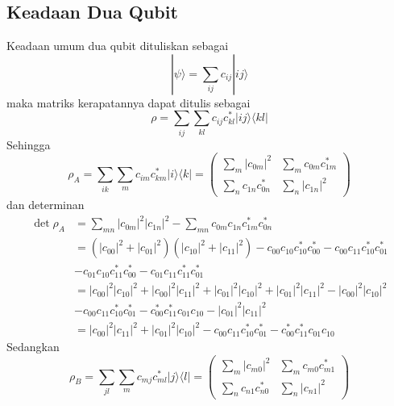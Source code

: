 \subsection{Keadaan Dua Qubit}
\par
Keadaan umum dua qubit dituliskan sebagai
\begin{equation}
	|\psi\rangle = \sum_{i j} c_{i j} | i j \rangle
\end{equation}
maka matriks kerapatannya dapat ditulis sebagai
\begin{equation}
	\rho = \sum_{i j} \sum_{k l} c_{i j} c^{*}_{k l} | i j \rangle \langle k l |
\end{equation}
Sehingga
\begin{equation}
	\rho_A
	= \sum_{i k} \sum_{m} c_{i m} c^{*}_{k m} | i \rangle \langle k |
	= \begin{pmatrix}
		\sum_m |c_{0m}|^2 & \sum_m c_{0m} c^{*}_{1m} \\
		\sum_n c_{1n} c^{*}_{0n} & \sum_n |c_{1n}|^2
	\end{pmatrix}
\end{equation}
dan determinan
\begin{equation}
	\begin{aligned}
		\det \rho_A
		&= \sum_{m n} |c_{0m}|^2 |c_{1n}|^2
		- \sum_{m n} c_{0m} c_{1n} c^{*}_{1m} c^{*}_{0n}\\
		&= (|c_{00}|^2 + |c_{01}|^2)(|c_{10}|^2 + |c_{11}|^2) - c_{00} c_{10} c^{*}_{10} c^{*}_{00} - c_{00} c_{11} c^{*}_{10} c^{*}_{01}\\
		&- c_{01} c_{10} c^{*}_{11} c^{*}_{00} - c_{01} c_{11} c^{*}_{11} c^{*}_{01}\\
		&= |c_{00}|^2 |c_{10}|^2
		+ |c_{00}|^2 |c_{11}|^2
		+ |c_{01}|^2 |c_{10}|^2
		+ |c_{01}|^2 |c_{11}|^2- |c_{00}|^2 |c_{10}|^2\\
		&- c_{00} c_{11} c^{*}_{10} c^{*}_{01}
		- c^{*}_{00} c^{*}_{11} c_{01} c_{10}- |c_{01}|^2 |c_{11}|^2\\
		&= |c_{00}|^2 |c_{11}|^2
		+ |c_{01}|^2 |c_{10}|^2
		- c_{00} c_{11} c^{*}_{10} c^{*}_{01}
		- c^{*}_{00} c^{*}_{11} c_{01} c_{10}
	\end{aligned}
\end{equation}
Sedangkan
\begin{equation}
	\rho_B
	= \sum_{j l} \sum_m c_{m j} c^{*}_{m l} | j \rangle \langle l |
	= \begin{pmatrix}
		\sum_m |c_{m0}|^2 & \sum_m c_{m0} c^{*}_{m1} \\
		\sum_n c_{n1} c^{*}_{n0} & \sum_n |c_{n1}|^2
	\end{pmatrix}
\end{equation}

